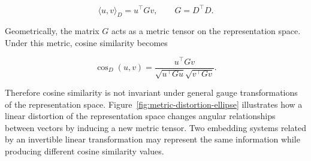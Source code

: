 \documentclass[11pt]{article}
\begin{document}
\begin{equation}
\langle u,v\rangle_D
=
u^\top G v,
\qquad
G = D^\top D .
\label{eq:metric_pullback}
\end{equation}

Geometrically, the matrix $G$ acts as a metric tensor on the
representation space.
Under this metric, cosine similarity becomes

\[
\cos_D(u,v)
=
\frac{u^\top G v}
{\sqrt{u^\top G u}\sqrt{v^\top G v}}.
\]

Therefore cosine similarity is not invariant under general gauge
transformations of the representation space. Figure~\ref{fig:metric-distortion-ellipse} illustrates how a linear
distortion of the representation space changes angular relationships
between vectors by inducing a new metric tensor.
Two embedding systems related by an invertible linear transformation may
represent the same information while producing different cosine
similarity values.
\end{document}
